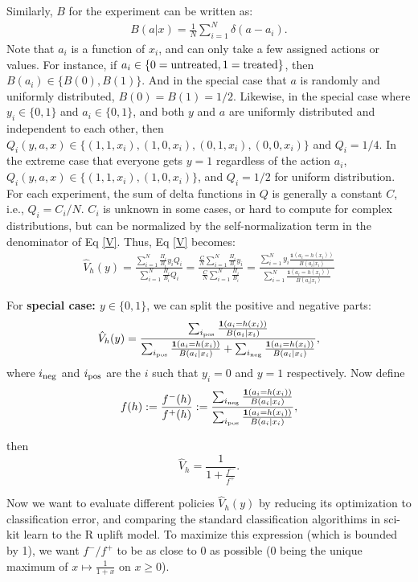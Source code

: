 \documentclass[11pt, oneside]{article}   	%
\begin{document}
Similarly, $B$ for the experiment can be written as:
\begin{align}
	B(a|x) = \frac{1}{N} \sum_{i=1}^{N}\delta(a - a_i) .
\end{align}
Note that $a_i$ is a function of $x_i$, and can only take a few assigned actions or values. For instance, if $a_i \in \{0=\rm{untreated}, 1=\rm{treated}\}$, then $B(a_i) \in \{B(0), B(1)\}$. And in the special case that $a$ is randomly and uniformly distributed, $B(0) = B(1) = 1/2$. Likewise, in the special case where $y_i \in \{0, 1 \}$ and $a_i \in \{0, 1\}$, and both $y$ and $a$ are uniformly distributed and independent to each other, then $ Q_i(y,a,x) \in \{ (1,1, x_i), (1,0, x_i), (0,1,x_i), (0,0, x_i) \}$ and  $Q_i = 1/4$. In the extreme case that everyone gets $y=1$ regardless of the action $a_i$,  $ Q_i(y,a,x) \in \{ (1,1, x_i), (1,0, x_i) \}$, and $Q_i = 1/2$ for uniform distribution. \\

For each experiment, the sum of delta functions in $Q$ is generally a constant $C$, i.e., $Q_i=C_i/N$. $C_i$ is unknown in some cases, or hard to compute for complex distributions, but can be normalized by the self-normalization term in the denominator of Eq \ref{V}. Thus, Eq \ref{V} becomes:
\begin{align}
\hat{V}_h(y) =  \frac{\sum_{i=1}^{N} \frac{\Pi_i}{B_i} y_i  Q_i }{\sum _{i=1}^{N} \frac{\Pi_i}{B_i} Q_i}
=\frac{ \frac{C}{N} \sum_{i=1}^{N} \frac{\Pi_i}{B_i} y_i }{\frac{C}{N} \sum _{i=1}^{N} \frac{\Pi_i}{B_i}}  
   =  \frac{  \sum_{i=1}^N  y_i \frac{\mathbf{1}(a_i=h(x_i))}{B(a_i|x_i)} }{ \sum_{i=1}^N  \frac{\mathbf{1}(a_i=h(x_i))}{B(a_i|x_i)} }
  \end{align}

For {\bf special case: $y\in\{0,1\}$}, we can split the positive and negative parts:
\begin{align}
\hat{V}_h(y)
 = \frac{ \sum_{i_{\rm pos}} \frac{ \mathbf{1}(a_i=h(x_i))}{B(a_i|x_i)}}{ \sum_{i_{\rm pos}}\frac{\mathbf{1}(a_i=h(x_i))}{B(a_i|x_i)}+\sum_{i_{\rm neg}}\frac{ \mathbf{1}(a_i=h(x_i))}{B(a_i|x_i)}}, 
\end{align}
where $i_{\rm neg}$ and $i_{\rm pos}$ are the $i$ such that $y_i=0$ and $y=1$ respectively. 
Now define 
$$f(h) := \frac{f^-(h)}{f^+(h)} := \frac{\sum_{i_{\rm neg}}\frac{ \mathbf{1}(a_i=h(x_i))}{B(a_i|x_i)}}{\sum_{i_{\rm pos}}\frac{ \mathbf{1}(a_i=h(x_i))}{B(a_i|x_i)}},$$

then 
$$\hat V_h = \frac{1}{1+\frac{f^-}{f^+}}.$$ 

Now we want to evaluate different policies $\hat{V}_h(y)$ by reducing its optimization to classification error, and comparing the standard classification algorithims in sci-kit learn to the R uplift model. 
To maximize this expression (which is bounded by 1), we want $f^-/f^+$ to be as close to $0$ as possible ($0$ being the unique maximum of $x \mapsto \frac{1}{1+x}$ on $x \geq 0$).
\end{document}
